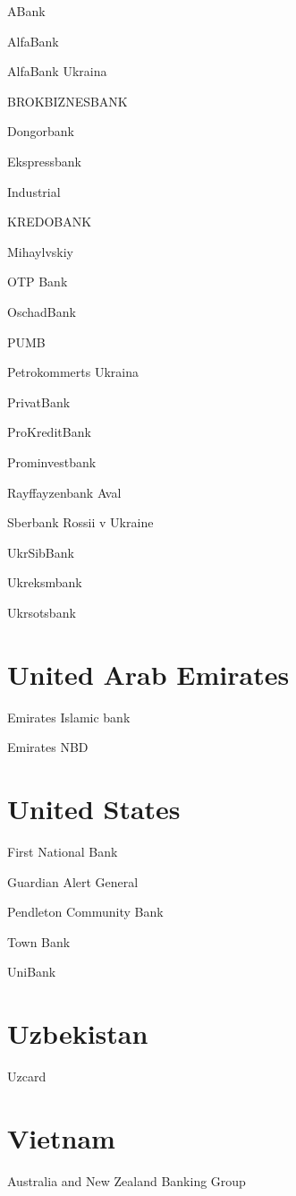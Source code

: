 \documentclass[a4paper,10pt,english]{sphinxmanual}
\begin{document}
ABank

AlfaBank

AlfaBank Ukraina

BROKBIZNESBANK

Dongorbank

Ekspressbank

Industrial

KREDOBANK

Mihaylvskiy

OTP Bank

OschadBank

PUMB

Petrokommerts Ukraina

PrivatBank

ProKreditBank

Prominvestbank

Rayffayzenbank Aval

Sberbank Rossii v Ukraine

UkrSibBank

Ukreksmbank

Ukrsotsbank


\section{United Arab Emirates}
\label{\detokenize{banks:united-arab-emirates}}
Emirates Islamic bank

Emirates NBD


\section{United States}
\label{\detokenize{banks:united-states}}
First National Bank

Guardian Alert General

Pendleton Community Bank

Town Bank

UniBank


\section{Uzbekistan}
\label{\detokenize{banks:uzbekistan}}
Uzcard


\section{Vietnam}
\label{\detokenize{banks:vietnam}}
Australia and New Zealand Banking Group
\end{document}
